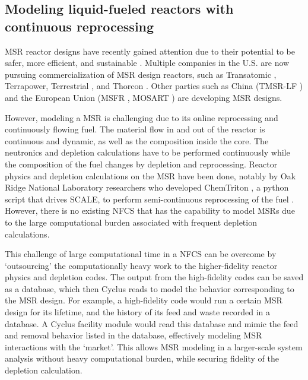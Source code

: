 \subsection{Modeling liquid-fueled reactors with continuous reprocessing}
\gls{MSR} reactor designs have recently gained attention due to 
their potential to be 
safer, more efficient, and sustainable \cite{serp_molten_2014}.
Multiple companies in the U.S. are now pursuing
commercialization of \gls{MSR} design reactors, such as Transatomic \cite{transatomic_power_corporation_technical_2016}
, Terrapower, Terrestrial \cite{leblanc_18_2017}, and
Thorcon \cite{jorgensen_19_2017}. Other parties such as China (TMSR-LF \cite{dai_17_2017}) 
and the European Union (MSFR \cite{heuer_towards_2014}, MOSART \cite{ignatiev_molten_2014})
are developing \gls{MSR} designs.

However, modeling a \gls{MSR} is challenging due to its online reprocessing
and continuously flowing fuel.
The material flow in and out of the reactor is continuous and dynamic, as well as the
composition inside the core.
The neutronics and depletion calculations have to be performed continuously while
the composition of the fuel changes by depletion and reprocessing.
Reactor physics and depletion calculations
on the \gls{MSR} have been done, notably by 
 Oak Ridge National Laboratory researchers who developed
ChemTriton \cite{powers_new_2013}, a python script that drives SCALE,
to perform semi-continuous reprocessing of the fuel \cite{powers_inventory_2014, betzler_fuel_2018}.
However, there is no existing \gls{NFCS} that has the capability to model \glspl{MSR}
due to the large computational burden associated with frequent depletion calculations.

This challenge of large computational time in a \gls{NFCS} can be overcome by `outsourcing' the computationally
heavy work to the higher-fidelity reactor physics and depletion codes. The output from the
high-fidelity codes can be saved as a database, which then Cyclus reads to model the behavior
corresponding to the \gls{MSR} design. For example, a high-fidelity code would run a certain
\gls{MSR} design for its lifetime, and the history of its feed and waste recorded in a
database. A Cyclus facility module would read this database and mimic the feed and removal
behavior listed in the database, effectively modeling \gls{MSR} interactions with the `market'.
This allows \gls{MSR} modeling in a larger-scale system analysis without heavy computational
burden, while securing fidelity of the depletion calculation.